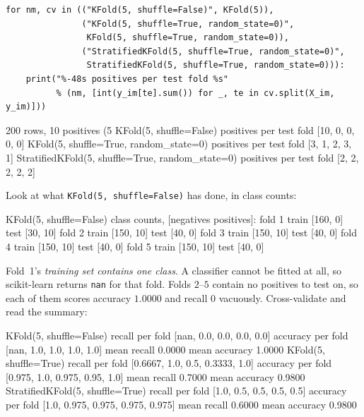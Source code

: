 \documentclass[11pt]{article}
\begin{document}
\begin{lstlisting}
for nm, cv in (("KFold(5, shuffle=False)", KFold(5)),
               ("KFold(5, shuffle=True, random_state=0)",
                KFold(5, shuffle=True, random_state=0)),
               ("StratifiedKFold(5, shuffle=True, random_state=0)",
                StratifiedKFold(5, shuffle=True, random_state=0))):
    print("%-48s positives per test fold %s"
          % (nm, [int(y_im[te].sum()) for _, te in cv.split(X_im, y_im)]))
\end{lstlisting}
\begin{codeout}
200 rows, 10 positives (5%
   KFold(5, shuffle=False)                          positives per test fold [10, 0, 0, 0, 0]
   KFold(5, shuffle=True, random_state=0)           positives per test fold [3, 1, 2, 3, 1]
   StratifiedKFold(5, shuffle=True, random_state=0) positives per test fold [2, 2, 2, 2, 2]
\end{codeout}

Look at what \texttt{KFold(5, shuffle=False)} has done, in class counts:

\begin{codeout}
KFold(5, shuffle=False) class counts, [negatives positives]:
   fold 1  train [160, 0]   test [30, 10]
   fold 2  train [150, 10]   test [40, 0]
   fold 3  train [150, 10]   test [40, 0]
   fold 4  train [150, 10]   test [40, 0]
   fold 5  train [150, 10]   test [40, 0]
\end{codeout}

Fold~1's \emph{training set contains one class}. A classifier cannot be fitted
at all, so scikit-learn returns \texttt{nan} for that fold. Folds $2$--$5$
contain no positives to test on, so each of them scores accuracy $1.0000$ and
recall $0$ vacuously. Cross-validate and read the summary:

\begin{codeout}
   KFold(5, shuffle=False)          recall   per fold [nan, 0.0, 0.0, 0.0, 0.0]
                                    accuracy per fold [nan, 1.0, 1.0, 1.0, 1.0]
                                    mean recall 0.0000   mean accuracy 1.0000
   KFold(5, shuffle=True)           recall   per fold [0.6667, 1.0, 0.5, 0.3333, 1.0]
                                    accuracy per fold [0.975, 1.0, 0.975, 0.95, 1.0]
                                    mean recall 0.7000   mean accuracy 0.9800
   StratifiedKFold(5, shuffle=True) recall   per fold [1.0, 0.5, 0.5, 0.5, 0.5]
                                    accuracy per fold [1.0, 0.975, 0.975, 0.975, 0.975]
                                    mean recall 0.6000   mean accuracy 0.9800
\end{codeout}
\end{document}
